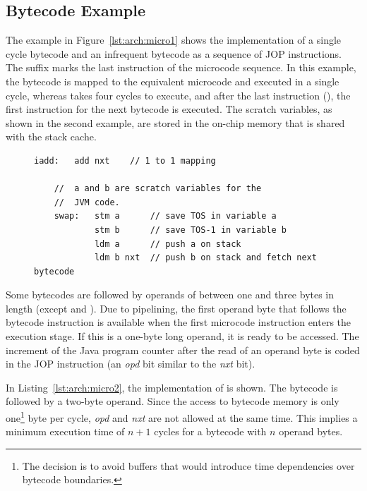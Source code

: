 \subsection{Bytecode Example}

The example in Figure~\ref{lst:arch:micro1} shows the implementation
of a single cycle bytecode and an infrequent bytecode as a sequence
of JOP instructions. The suffix  marks the last instruction
of the microcode sequence. In this example, the  bytecode
is mapped to the equivalent  microcode and executed in a
single cycle, whereas  takes four cycles to execute, and
after the last instruction (), the first instruction
for the next bytecode is executed. The scratch variables, as shown in
the second example, are stored in the on-chip memory that is shared
with the stack cache.

\begin{figure}
\begin{lstlisting}[caption={Implementation of \code{iadd} and \code{swap}},
label=lst:arch:micro1]
    iadd:   add nxt    // 1 to 1 mapping

    //  a and b are scratch variables for the
    //  JVM code.
    swap:   stm a      // save TOS in variable a
            stm b      // save TOS-1 in variable b
            ldm a      // push a on stack
            ldm b nxt  // push b on stack and fetch next bytecode
\end{lstlisting}
\end{figure}

Some bytecodes are followed by operands of between one and three
bytes in length (except  and ).
Due to pipelining, the first operand byte that follows the bytecode
instruction is available when the first microcode instruction enters
the execution stage. If this is a one-byte long operand, it is ready
to be accessed. The increment of the Java program counter after the
read of an operand byte is coded in the JOP instruction (an
\emph{opd} bit similar to the \emph{nxt} bit).

In Listing~\ref{lst:arch:micro2}, the implementation of
 is shown. The bytecode is followed by a two-byte
operand. Since the access to bytecode memory is only
one\footnote{The decision is to avoid buffers that would introduce
time dependencies over bytecode boundaries.} byte per cycle,
\emph{opd} and \emph{nxt} are not allowed at the same time. This
implies a minimum execution time of $n+1$ cycles for a bytecode with
$n$ operand bytes.

